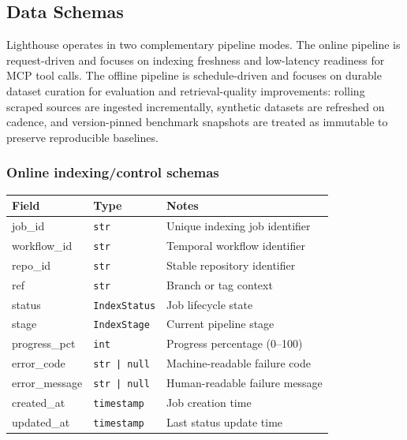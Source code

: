 \documentclass[a4paper,12pt]{article}
\begin{document}
\subsection{Data Schemas}

\noindent Lighthouse operates in two complementary pipeline modes. The online pipeline is request-driven and focuses on indexing freshness and low-latency readiness for MCP tool calls. The offline pipeline is schedule-driven and focuses on durable dataset curation for evaluation and retrieval-quality improvements: rolling scraped sources are ingested incrementally, synthetic datasets are refreshed on cadence, and version-pinned benchmark snapshots are treated as immutable to preserve reproducible baselines.

\subsubsection{Online indexing/control schemas}

\captionsetup{type=table}
\begin{tcolorbox}[title=IndexJobSchema]
\footnotesize
\begin{tabularx}{\linewidth}{@{} l l Y @{}}
\toprule
\textbf{Field} & \textbf{Type} & \textbf{Notes} \\
\midrule
job\_id & \texttt{str} & Unique indexing job identifier \\
workflow\_id & \texttt{str} & Temporal workflow identifier \\
repo\_id & \texttt{str} & Stable repository identifier \\
ref & \texttt{str} & Branch or tag context \\
status & \texttt{IndexStatus} & Job lifecycle state \\
stage & \texttt{IndexStage} & Current pipeline stage \\
progress\_pct & \texttt{int} & Progress percentage (0--100) \\
error\_code & \texttt{str | null} & Machine-readable failure code \\
error\_message & \texttt{str | null} & Human-readable failure message \\
created\_at & \texttt{timestamp} & Job creation time \\
updated\_at & \texttt{timestamp} & Last status update time \\
\bottomrule
\end{tabularx}
\end{tcolorbox}
\end{document}
